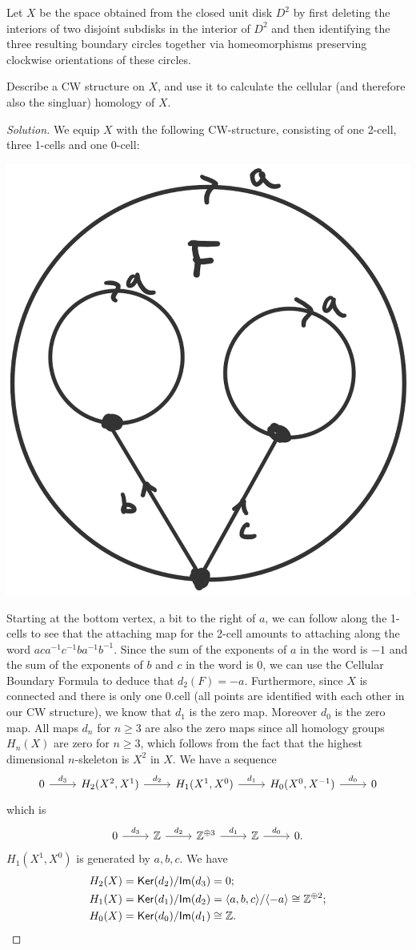 \begin{problem}

  Let $X$ be the space obtained from the closed unit disk $D^2$ by first deleting the interiors of two disjoint subdisks in the interior of $D^2$ and then identifying the three resulting boundary circles together via homeomorphisms preserving clockwise orientations of these circles.

  Describe a CW structure on $X$, and use it to calculate the cellular (and therefore also the singluar) homology of $X$.
\end{problem}
\begin{proof}[Solution]
We equip $X$ with the following CW-structure, consisting of one 2-cell, three 1-cells and one 0-cell:
\begin{center}
  \includegraphics[width = 0.3\linewidth]{CW.png}
\end{center}
Starting at the bottom vertex, a bit to the right of $a$, we can follow along the 1-cells to see that the attaching map for the 2-cell amounts to attaching along the word $aca^{-1}c^{-1}ba^{-1}b^{-1}$. Since the sum of the exponents of $a$ in the word is $-1$ and the sum of the exponents of $b$ and $c$ in the word is 0, we can use the Cellular Boundary Formula to deduce that $d_2(F) = -a$. Furthermore, since $X$ is connected and there is only one 0.cell (all points are identified with each other in our CW structure), we know that $d_{1}$ is the zero map. Moreover $d_0$ is the zero map. All maps $d_n$ for $n\geq 3$ are also the zero maps since all homology groups $H_n(X)$ are zero for $n\geq 3$, which follows from the fact that the highest dimensional $n$-skeleton is $X^2$ in $X$. We have a sequence
\[
\begin{tikzcd}
  0 \arrow[r, "d_3"] & H_2(X^2, X^1) \arrow[r, "d_2"] & H_1(X^1, X^0) \arrow[r, "d_1"] & H_0(X^0, X^{-1}) \arrow[r, "d_0"] & 0
\end{tikzcd}
\]
which is
\[
\begin{tikzcd}
  0 \arrow[r, "d_3"] & \Z \arrow[r, "d_2"] & \Z^{\oplus 3} \arrow[r, "d_1"] & \Z \arrow[r, "d_0"] & 0.
\end{tikzcd}
\]
$H_1(X^1, X^0)$ is generated by $a, b, c$. We have
\[
\begin{aligned}
H_2(X) &= \mathsf{Ker}(d_2)/\mathsf{Im}(d_3) = 0; \\
H_1(X) &= \mathsf{Ker}(d_1)/\mathsf{Im}(d_2) = \langle a, b, c \rangle/\langle -a \rangle \cong \mathbb{Z}^{\oplus2}; \\
H_0(X) &= \mathsf{Ker}(d_0)/\mathsf{Im}(d_1) \cong \mathbb{Z}.
\end{aligned}
\]
\end{proof}



